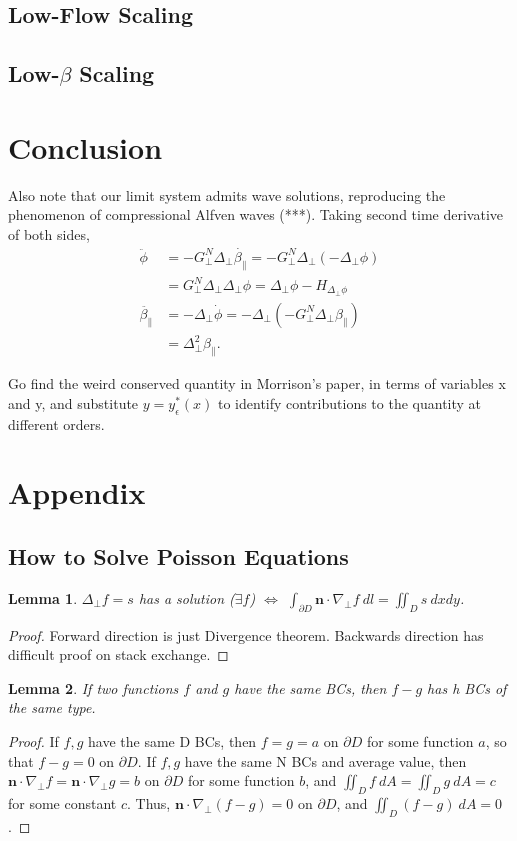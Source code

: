 \documentclass{article}
\newtheorem{lemma}{Lemma}
\newcommand{\para}{\parallel}
\newcommand{\ep}{\epsilon}
\newcommand{\np}{\nabla_\perp}
\newcommand{\lap}{\Delta_\perp}
\newcommand{\p}{\partial}
\newcommand{\GN}{G_\perp^N}
\newcommand{\pth} [1] {\left( #1 \right) }
\begin{document}
\subsection{Low-Flow Scaling}


\subsection{Low-$\beta$ Scaling}






\section{Conclusion}
Also note that our limit system admits wave solutions, reproducing the phenomenon of compressional Alfven waves (***). Taking second time derivative of both sides, 
\begin{align}
    \ddot{\phi} &= -\GN\lap \dot{\beta_\para} = -\GN\lap \pth{-\lap \phi} \\ 
    &= \GN\lap\lap \phi = \lap\phi - H_{\lap\phi} \\ 
    \ddot{\beta_\para} &= -\lap \dot{\phi} = -\lap \pth{-\GN\lap\beta_\para} \\ 
    &= \lap^2\beta_\para. 
\end{align}

Go find the weird conserved quantity in Morrison's paper, in terms of variables x and y, and substitute $y=y^*_\ep(x)$ to identify contributions to the quantity at different orders. 


\section{Appendix}
\subsection{How to Solve Poisson Equations} \label{poisson}
\begin{lemma} \label{Neumann Problem}
    $\lap f=s$ has a solution ($\exists f$) $\Longleftrightarrow$ $\int_{\p D} \bm{n}\cdot\np f\ dl = \iint_D s\ dxdy$.
\end{lemma} 
\begin{proof}
    Forward direction is just Divergence theorem. Backwards direction has difficult proof on stack exchange.  
\end{proof}

\begin{lemma} \label{Homo BCs}
    If two functions $f$ and $g$ have the same BCs, then $f-g$ has h BCs of the same type. 
\end{lemma}
\begin{proof}
    If $f,g$ have the same D BCs, then $f=g=a$ on $\p D$ for some function $a$, so that $f-g=0$ on $\p D$. If $f,g$ have the same N BCs and average value, then $\bm{n}\cdot\np f = \bm{n}\cdot\np g = b$ on $\p D$ for some function $b$, and $\iint_D f\ dA = \iint_D g\ dA = c$ for some constant $c$. Thus, $\bm{n}\cdot\np (f-g) = 0$ on $\p D$, and $\iint_D (f-g)\ dA = 0$.
\end{proof}
\end{document}
